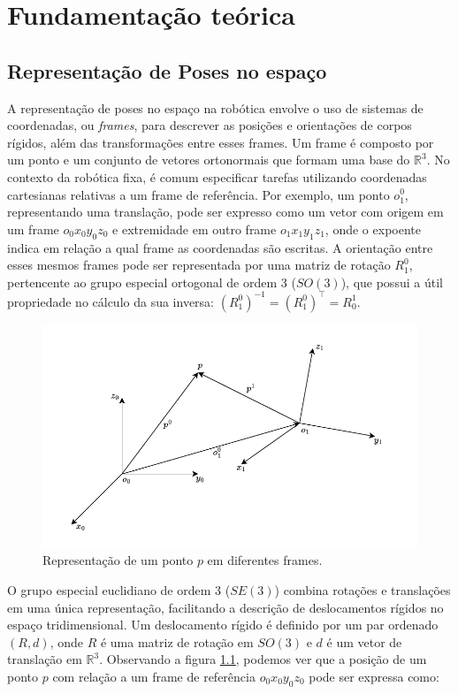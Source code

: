 \chapter{Fundamentação teórica}\label{cap:background}

\section{Representação de Poses no espaço}

A representação de poses no espaço na robótica envolve o uso de sistemas de 
coordenadas, ou \emph{frames}, para descrever as posições e orientações de corpos 
rígidos, além das transformações entre esses frames. Um frame é composto por 
um ponto e um conjunto de vetores ortonormais que formam uma base do \(\mathbb{R}^3\). 
No contexto da robótica fixa, é comum especificar tarefas utilizando coordenadas 
cartesianas relativas a um frame de referência. Por exemplo, um ponto \(o_1^0\),
representando uma translação, pode ser expresso como um vetor com origem em um 
frame \(o_0 x_0 y_0 z_0\) e extremidade em outro frame \(o_1 x_1 y_1 z_1\), onde o expoente
indica em relação a qual frame as coordenadas são escritas. 
A orientação entre esses mesmos frames pode ser representada por uma matriz de rotação
\( R_1^0 \), pertencente ao grupo especial ortogonal de ordem 3 (\(SO(3)\)),
que possui a útil propriedade no cálculo da sua inversa: \((R_1^0)^{-1} = (R_1^0)^\top = R_0^1 \).

\begin{figure}
    \centering
    \includegraphics[width=0.8\linewidth]{Images/frames.pdf}
    \caption{Representação de um ponto \(p\) em diferentes frames.} \label{fig:frames}
\end{figure}

O grupo especial euclidiano de ordem 3 (\(SE(3)\)) combina rotações e 
translações em uma única representação, facilitando a descrição de 
deslocamentos rígidos no espaço tridimensional. Um deslocamento rígido 
é definido por um par ordenado \((R, d)\), onde \(R\) é uma matriz de 
rotação em \(SO(3)\) e \(d\) é um vetor de translação em \(\mathbb{R}^3\). Observando
a figura \ref{fig:frames}, podemos ver que a posição de um ponto \(p\) com relação
a um frame de referência \(o_0 x_0 y_0 z_0\) pode ser expressa como:

